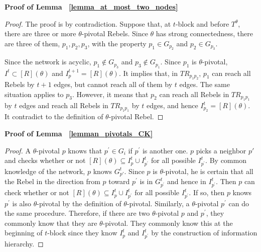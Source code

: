 \documentclass[12pt,letter]{article}
\newtheorem*{lemma*}{Lemma}
\theoremstyle{definition}
\theoremstyle{remark}
\theoremstyle{claim}
\begin{document}
\noindent\textbf{Proof of Lemma ~\ref{lemma_at_most_two_nodes}}
   
\begin{proof}
The proof is by contradiction. Suppose that, at $t$-block and before $T^{\theta}$, there are three or more $\theta$-pivotal Rebels. Since $\theta$ has strong connectedness, there are three of them, $p_1,p_2,p_3$, with the property $p_1\in G_{p_2}$ and $p_2 \in G_{p_3}$. 

Since the network is acyclic, $p_1\notin G_{p_3}$ and $p_3\notin G_{p_1}$. Since $p_1$ is $\theta$-pivotal, $I^t\subset [R](\theta)$ and $I^{t+1}_p=[R](\theta)$. It implies that, in $TR_{p_1p_2}$, $p_1$ can reach all Rebels by $t+1$ edges, but cannot reach all of them by $t$ edges. The same situation applies to $p_3$. However, it means that $p_2$ can reach all Rebels in $TR_{p_1p_1}$ by $t$ edges and reach all Rebels in $TR_{p_1p_1}$ by $t$ edges, and hence $I^t_{p_2}=[R](\theta)$. It contradict to the definition of $\theta$-pivotal Rebel.

\end{proof}



\bigskip
\noindent\textbf{Proof of Lemma ~\ref{lemman_pivotals_CK}}
\begin{proof}
A $\theta$-pivotal $p$ knows that $p^{'}\in G_i$ if $p^{'}$ is another one. $p$ picks a neighbor $p'$ and checks whether or not $[R](\theta)\subseteq I^t_{p}\cup I^t_{p^{'}}$ for all possible $I^t_{p^{'}}$. By common knowledge of the network, $p$ knows $G^t_{p{'}}$. Since $p$ is $\theta$-pivotal, he is certain that all the Rebel in the direction from $p$ toward $p^{'}$ is in $G^t_{p^{'}}$ and hence in $I^t_{p^{'}}$. Then $p$ can check whether or not $[R](\theta)\subseteq I^t_{p}\cup I^t_{p^{'}}$ for all possible $I^t_{p^{'}}$. If so, then $p$ knows $p^{'}$ is also $\theta$-pivotal by the definition of $\theta$-pivotal. Similarly, a $\theta$-pivotal $p^{'}$ can do the same procedure. Therefore, if there are two $\theta$-pivotal $p$ and $p^{'}$, they commonly know that they are $\theta$-pivotal. They commonly know this at the beginning of $t$-block since they know $I^t_{p}$ and $I^t_{p^{'}}$ by the construction of information hierarchy.
\end{proof}
\end{document}
